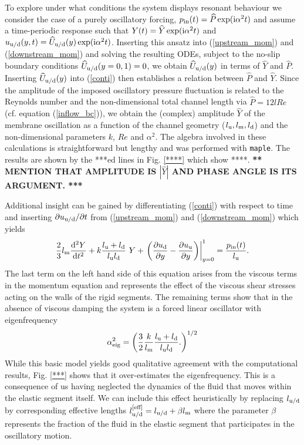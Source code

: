 \documentclass[aps,prl,reprint,superscriptaddress,floatfix]{revtex4-1}
\newcommand{\Rey}{\mathit{Re}}
\newcommand{\be}{\begin{equation}}
\newcommand{\ee}{\end{equation}}
\begin{document}
To explore under what conditions the system displays resonant
behaviour we consider the case of a purely oscillatory forcing, $p_{\rm in}(t) =
\widehat{P} \exp({\rm i}\alpha^2 t)$ and assume a time-periodic response such
that $Y(t) = \widehat{Y} \exp({\rm i}\alpha^2 t)$ and
$u_{\rm u/d}(y,t) = \widehat{U}_{\rm u/d}(y) \exp({\rm i}\alpha^2
t)$. Inserting this ansatz into (\ref{upstream_mom}) and
(\ref{downstream_mom}) and solving the resulting ODEs, subject to
the no-slip boundary conditions $\widehat{U}_{\rm u/d}(y=0,1)=0$,
we obtain $\widehat{U}_{\rm u/d}(y)$ in terms
of $\widehat{Y}$ and $\widehat{P}$.
Inserting $\widehat{U}_{\rm u/d}(y)$ into (\ref{conti}) then
establishes a relation between $\widehat{P}$ and $\widehat{Y}$. Since the
amplitude of the imposed oscillatory pressure fluctuation is related
to the Reynolds number and the non-dimensional total channel length
via $\widehat{P} = 12 l \Rey$ (cf. equation (\ref{inflow_bc})), we obtain
the (complex) amplitude $\widehat{Y}$ of the membrane oscillation
as a function of the channel geometry ($l_{\rm u}, l_{\rm m}, l_{\rm
  d}$) and the non-dimensional parameters $k$, $Re$ and $\alpha^2$.
The algebra involved in these calculations is straightforward but
lengthy and was performed with {\tt maple}. The results are
shown by the ***ed lines in Fig. \ref{****} which show ****.
{\bf *** MENTION THAT AMPLITUDE IS $|\widehat{Y}|$ AND PHASE
  ANGLE IS ITS ARGUMENT. ***}

 Additional insight can be gained by differentiating (\ref{conti})
with respect to time and inserting $\partial u_{\rm u/d}/\partial t$
from (\ref{upstream_mom}) and (\ref{downstream_mom}) which yields
\be
\frac{2}{3}l_{\rm m} \frac{{\rm d}^2 Y}{{\rm d}t^2} +
k \frac{l_{\rm u} + l_{\rm d}}{l_{\rm u} l_{\rm d}} \ Y
+ \left.
\left( \frac{\partial u_{\rm d}}{\partial y} -
       \frac{\partial u_{\rm u}}{\partial y} \right)
\right|_{y=0}^1 = \frac{p_{\rm in}(t)}{l_{\rm u}}.
\ee
The last term on the left hand side of this equation arises from the
viscous terms in the momentum equation and represents the effect of
the viscous shear stresses acting on the walls of the rigid segments.
The remaining terms show that in the absence of viscous damping
the system is a forced linear oscillator with eigenfrequency
\be
\alpha_{\rm eig}^2 = \left( 
\frac{3}{2} \frac{k}{l_{\rm m}}
\frac{l_{\rm u} + l_{\rm d}}{l_{\rm u} l_{\rm d}}.
\right)^{1/2}
\ee
While this basic model yields good qualitative agreement
with the computational results, Fig. \ref{***} shows that
it over-estimates the eigenfrequency. This is a consequence of us
having neglected the dynamics of the fluid that moves within the
elastic segment itself. We can include this effect heuristically by replacing
$l_{\rm u/d}$ by corresponding effective lengths $l_{\rm u/d}^{\rm [eff]} =
l_{\rm u/d} + \beta l_{\rm m}$ where the parameter $\beta$
represents the fraction of the fluid in the elastic
segment that participates in the oscillatory motion.
\end{document}
